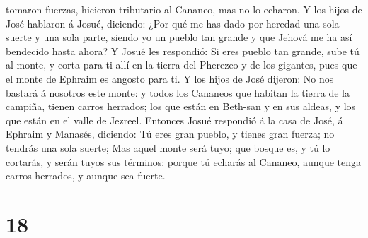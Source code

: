 tomaron fuerzas, hicieron tributario al Cananeo, mas no lo echaron.
 Y los hijos de José hablaron á Josué, diciendo: ¿Por qué
me has dado por heredad una sola suerte y una sola parte, siendo yo un
pueblo tan grande y que Jehová me ha así bendecido hasta ahora?
 Y Josué les respondió: Si eres pueblo tan grande, sube tú
al monte, y corta para ti allí en la tierra del Pherezeo y de los
gigantes, pues que el monte de Ephraim es angosto para ti. 
Y los hijos de José dijeron: No nos bastará á nosotros este monte: y
todos los Cananeos que habitan la tierra de la campiña, tienen carros
herrados; los que están en Beth-san y en sus aldeas, y los que están en
el valle de Jezreel.  Entonces Josué respondió á la casa de
José, á Ephraim y Manasés, diciendo: Tú eres gran pueblo, y tienes gran
fuerza; no tendrás una sola suerte;  Mas aquel monte será
tuyo; que bosque es, y tú lo cortarás, y serán tuyos sus términos:
porque tú echarás al Cananeo, aunque tenga carros herrados, y aunque sea
fuerte.

\hypertarget{section-17}{%
\section{18}\label{section-17}}


